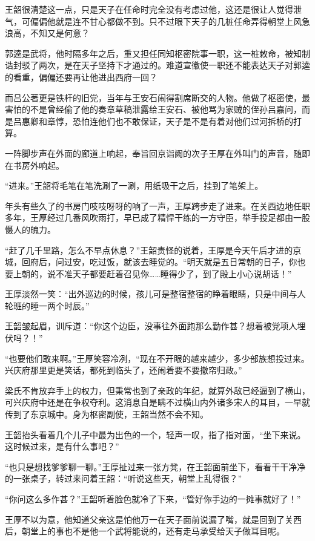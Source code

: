 王韶很清楚这一点，只是天子在任命时完全没有考虑过他，这还是很让人觉得泄气，可偏偏他就是连不甘心都做不到。只不过眼下天子的几桩任命弄得朝堂上风急浪高，不知又是何意？

郭逵是武将，他时隔多年之后，重又担任同知枢密院事一职，这一桩敇命，被知制诰封驳了两次，是在天子坚持下才通过的。难道宣徽使一职还不能表达天子对郭逵的看重，偏偏还要再让他进出西府一回？

而吕公著更是铁杆的旧党，当年与王安石闹得割席断交的人物。他做了枢密使，最害怕的不是曾经偷了他的奏章草稿泄露给王安石、被他骂为家贼的侄孙吕嘉问，而是吕惠卿和章惇，恐怕连他们也不敢保证，天子是不是有着对他们过河拆桥的打算。

一阵脚步声在外面的廊道上响起，奉旨回京诣阙的次子王厚在外叫门的声音，随即在书房外响起。

“进来。”王韶将毛笔在笔洗涮了一涮，用纸吸干之后，挂到了笔架上。

年头有些久了的书房门吱吱呀呀的响了一声，王厚跨步走了进来。在关西边地任职多年，王厚经过几番风吹雨打，早已成了精悍干练的一方守臣，举手投足都由一股慑人的魄力。

“赶了几千里路，怎么不早点休息？”王韶责怪的说着，王厚是今天午后才进的京城，回府后，问过安，吃过饭，就该去睡觉的。“明天就是五日常朝的日子，你也要上朝的，说不准天子都要赶着召见你……睡得少了，到了殿上小心说胡话！”

王厚淡然一笑：“出外巡边的时候，孩儿可是整宿整宿的睁着眼睛，只是中间与人轮班的睡一两个时辰。”

王韶皱起眉，训斥道：“你这个边臣，没事往外面跑那么勤作甚？想着被党项人埋伏吗？！”

“也要他们敢来啊。”王厚笑容冷冽，“现在不开眼的越来越少，多少部族想投过来。兴庆府那里更是笑话，都死到临头了，还闹着要不要撤帘归政。”

梁氏不肯放弃手上的权力，但秉常也到了亲政的年纪，就算外敌已经逼到了横山，可兴庆府中还是在争权夺利。这消息自是瞒不过横山内外诸多宋人的耳目，一早就传到了东京城中。身为枢密副使，王韶当然不会不知。

王韶抬头看着几个儿子中最为出色的一个，轻声一叹，指了指对面，“坐下来说。这时候过来，是有什么事吧？”

“也只是想找爹爹聊一聊。”王厚扯过来一张方凳，在王韶面前坐下，看看干干净净的一张桌子，转过来问着王韶：“听说这些天，朝堂上乱得很？”

“你问这么多作甚？”王韶听着脸色就冷了下来，“管好你手边的一摊事就好了！”

王厚不以为意，他知道父亲这是怕他万一在天子面前说漏了嘴，就是回到了关西后，朝堂上的事也不是他一个武将能说的，还有走马承受给天子做耳目呢。

